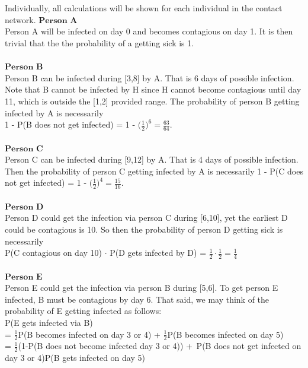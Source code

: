 \documentclass[12pt]{article}
\begin{document}
\newpage
\section{}
Individually, all calculations will be shown for each individual in the contact network.
\newline 
\newline 
$\textbf{Person A}$ \\
Person A will be infected on day 0 and becomes contagious on day 1. It is then trivial that the the probability of a getting sick is 1. 
\\
\\
$\textbf{Person B}$\\
Person B can be infected during [3,8] by A. That is 6 days of possible  infection. Note that B cannot be infected by H since H cannot become contagious until day 11, which is outside the [1,2] provided range. The probability of person B getting infected by A is necessarily \\ 1 - P(B does not get infected) = 1 - $\big( \frac{1}{2} \big)^6 = \frac{63}{64}$. 
\\
\\
$\textbf{Person C}$ \\
Person C can be infected during [9,12] by A. That is 4 days of possible infection. Then the probability of person C getting infected by A is necessarily 1 - P(C does not get infected) = 1 - $\big( \frac{1}{2} \big)^4 = \frac{15}{16}$.
\\
\\
$\textbf{Person D}$\\
Person D could get the infection via person C during [6,10], yet the earliest D could be contagious is 10. So then the probability of person D getting sick is necessarily \\ P(C contagious on day 10) $\cdot$ P(D gets infected by D) = $\frac{1}{2} \cdot \frac{1}{2} = \frac{1}{4}$
\\
\\
$\textbf{Person E}$ \\
Person E could get the infection via person B during [5,6]. To get person E infected, B must be contagious by day 6. That said, we may think of the probability of E getting infected as follows:
\\ P(E gets infected via B)  
\\ = $\frac{1}{2}$P(B becomes infected on day 3 or 4) + $\frac{1}{2}$P(B becomes infected on day 5) 
\\ = $\frac{1}{2}$(1-P(B does not become infected day 3 or 4)) + $\frac{}{}$P(B does not get infected on day 3 or 4)P(B gets infected on day 5)
\end{document}
